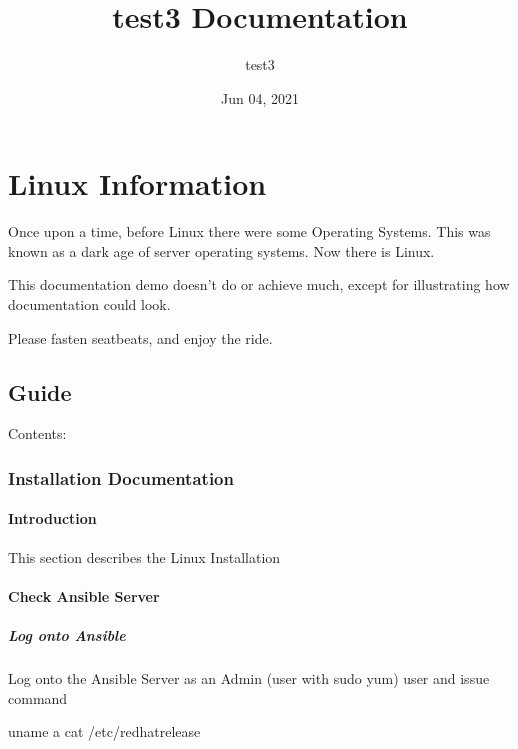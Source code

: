 \documentclass[letterpaper,10pt,english]{sphinxmanual}
\title{test3 Documentation}
\date{Jun 04, 2021}
\author{test3}
\begin{document}
\pagestyle{empty}
\sphinxmaketitle
\pagestyle{plain}
\sphinxtableofcontents
\pagestyle{normal}
\label{\detokenize{index::doc}}



\chapter{Linux Information}
\label{\detokenize{index:linux-information}}
\sphinxAtStartPar
Once upon a time, before Linux there were some Operating Systems. This was known as a dark age of server operating systems.
Now there is Linux.

\sphinxAtStartPar
This documentation demo doesn’t do or achieve much, except for illustrating how documentation could look.

\sphinxAtStartPar
Please fasten seatbeats, and enjoy the ride.


\section{Guide}
\label{\detokenize{index:guide}}
\sphinxAtStartPar
Contents:


\subsection{Installation Documentation}
\label{\detokenize{install:installation-documentation}}\label{\detokenize{install::doc}}

\subsubsection{Introduction}
\label{\detokenize{install:introduction}}
\sphinxAtStartPar
This section describes the Linux Installation


\subsubsection{Check Ansible Server}
\label{\detokenize{install:check-ansible-server}}

\paragraph{Log onto Ansible}
\label{\detokenize{install:log-onto-ansible}}
\sphinxAtStartPar
Log onto the Ansible Server as an Admin (user with sudo yum) user and issue command

\begin{sphinxVerbatim}[commandchars=\\\{\}]
uname \PYGZhy{}a
cat /etc/redhat\PYGZhy{}release
\end{sphinxVerbatim}
\end{document}
